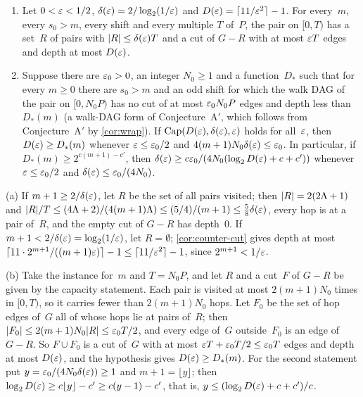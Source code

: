 \begin{proposition}\label{prop:dnp-capacity}
\notformalized
\begin{enumerate}[label=(\alph*)]
\item Let $0<\varepsilon<1/2$, $\delta(\varepsilon)=2/\log_2(1/\varepsilon)$ and $D(\varepsilon)=\lceil11/\varepsilon^2\rceil-1$. For every~$m$, every
$s_0>m$, every shift and every multiple $T$ of~$P$, the pair on $[0,T)$ has a set~$R$ of pairs with
$\lvert R \rvert\le\delta(\varepsilon)T$ and a cut of $G-R$ with at most $\varepsilon T$ edges and depth at most $D(\varepsilon)$.
\item Suppose there are $\varepsilon_0>0$, an integer $N_0\ge1$ and a function~$D_*$ such that for every $m\ge0$ there are $s_0>m$
and an odd shift for which the walk DAG of the pair on $[0,N_0P)$ has no cut of at most $\varepsilon_0N_0P$ edges and depth less
than $D_*(m)$ (a walk-DAG form of Conjecture~A$'$, which follows from Conjecture~A$'$ by \cref{cor:wrap}). If $\mathrm{Cap}(D(\varepsilon),\delta(\varepsilon),\varepsilon)$ holds for all~$\varepsilon$,
then $D(\varepsilon)\ge D_*(m)$ whenever $\varepsilon\le\varepsilon_0/2$ and $4(m+1)N_0\delta(\varepsilon)\le\varepsilon_0$. In particular, if
$D_*(m)\ge2^{c(m+1)-c'}$, then $\delta(\varepsilon)\ge c\varepsilon_0/(4N_0(\log_2D(\varepsilon)+c+c'))$ whenever $\varepsilon\le\varepsilon_0/2$ and
$\delta(\varepsilon)\le\varepsilon_0/(4N_0)$.
\end{enumerate}
\end{proposition}

\begin{informalproof}
(a) If $m+1\ge2/\delta(\varepsilon)$, let $R$ be the set of all pairs visited; then $\lvert R \rvert=2(2\Lambda+1)$ and
$\lvert R \rvert/T\le(4\Lambda+2)/(4(m+1)\Lambda)\le(5/4)/(m+1)\le\frac58\delta(\varepsilon)$, every hop is at a pair of~$R$, and the empty
cut of $G-R$ has depth~$0$. If $m+1<2/\delta(\varepsilon)=\log_2(1/\varepsilon)$, let $R=\emptyset$; \cref{cor:counter-cut} gives depth at
most $\lceil11\cdot2^{m+1}/((m+1)\varepsilon)\rceil-1\le\lceil11/\varepsilon^2\rceil-1$, since $2^{m+1}<1/\varepsilon$.

(b) Take the instance for~$m$ and $T=N_0P$, and let $R$ and a cut~$F$ of $G-R$ be given by the capacity statement. Each pair
is visited at most $2(m+1)N_0$ times in $[0,T)$, so it carries fewer than $2(m+1)N_0$ hops. Let $F_0$ be the set of hop edges
of~$G$ all of whose hops lie at pairs of~$R$; then $\lvert F_0 \rvert\le2(m+1)N_0\lvert R \rvert\le\varepsilon_0T/2$, and every edge of~$G$
outside~$F_0$ is an edge of $G-R$. So $F\cup F_0$ is a cut of~$G$ with at most $\varepsilon T+\varepsilon_0T/2\le\varepsilon_0T$ edges and depth
at most $D(\varepsilon)$, and the hypothesis gives $D(\varepsilon)\ge D_*(m)$. For the second statement put $y=\varepsilon_0/(4N_0\delta(\varepsilon))\ge1$
and $m+1=\lfloor y\rfloor$; then $\log_2D(\varepsilon)\ge c\lfloor y\rfloor-c'\ge c(y-1)-c'$, that is,
$y\le(\log_2D(\varepsilon)+c+c')/c$.
\end{informalproof}

